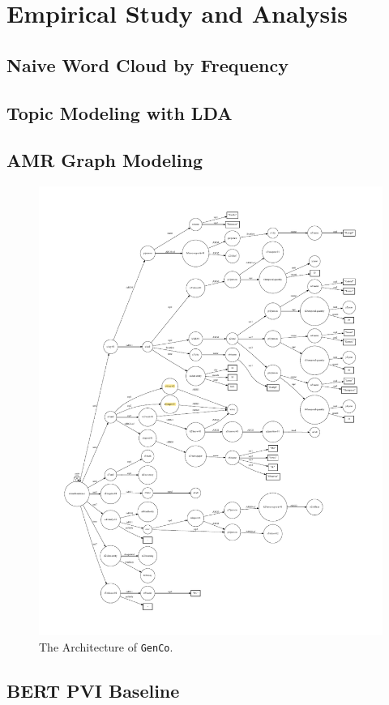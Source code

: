 \chapter{Empirical Study and Analysis}

\section{Naive Word Cloud by Frequency}

\section{Topic Modeling with LDA}

\section{AMR Graph Modeling}
\label{empirical-amr}

\begin{figure}[ht]
    \centering
    \includegraphics[width=\textwidth]{img/empirical-amr-left}
    \caption{The Architecture of \texttt{GenCo}.}
    \label{fig:empirical-amr-left}
\end{figure}

\section{BERT PVI Baseline}

